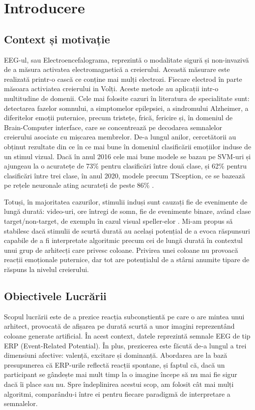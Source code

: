\chapter{Introducere}

\section{Context și motivație}
EEG-ul, sau Electroencefalograma, reprezintă o modalitate sigură și non-invazivă de a măsura activatea electromagnetică a creierului. Această măsurare este realizată printr-o cască ce conține mai mulți electrozi. Fiecare electrod în parte măsoara activiatea creierului in Volți. Aceste metode au aplicații intr-o multitudine de domenii. Cele mai folosite cazuri în literatura de specialitate sunt: detectarea fazelor somnului, a simptomelor epilepsiei, a sindromului Alzheimer, a diferitelor emoții puternice, precum tristețe, frică, fericire și, în domeniul de Brain-Computer interface, care se concentrează pe decodarea semnalelor creierului asociate cu mișcarea membrelor.
De-a lungul anilor, cercetătorii au obținut rezultate din ce în ce mai bune în domeniul clasificării emoțiilor induse de un stimul vizual. Dacă în anul 2016 cele mai bune modele se bazau pe SVM-uri și ajungeau la o acuratețe de 73\% \cite{ATKINSON201635} pentru clasificări între două clase, și 62\% pentru clasificări între trei clase, în anul 2020, modele precum TSception, ce se bazează pe rețele neuronale ating acurateți de peste 86\% \cite{TSception}. 

Totuși, în majoritatea cazurilor, stimulii induși sunt cauzați fie de evenimente de lungă durată: video-uri, ore întregi de somn, fie de evenimente binare, având clase target/non-target, de exemplu în cazul visual speller-elor \cite{visual_speller}. Mi-am propus să stabilesc dacă stimulii de scurtă durată au același potențial de a evoca răspunsuri capabile de a fi interpretate algoritmic precum cei de lungă durată în contextul unui grup de arhitecți care privesc coloane. Privirea unei coloane nu provoacă reacții emoționale puternice, dar tot are potențialul de a stârni anumite tipare de răspuns la nivelul creierului.

\section{Obiectivele Lucrării}
Scopul lucrării este de a prezice reacția subconștientă pe care o are mintea unui arhitect, provocată de afișarea pe durată scurtă a unor imagini reprezentând coloane generate artificial. În acest context, datele reprezintă semnale EEG de tip ERP (Event-Related Potential). În plus, prezicerea este făcută de-a lungul a trei dimensiuni afective: valență, excitare și dominanță. Abordarea are la bază presupunerea că ERP-urile reflectă reacții spontane, și faptul că, dacă un participant se gândește mai mult timp la o imagine începe să nu mai fie sigur dacă îi place sau nu. Spre îndeplinirea acestui scop, am folosit cât mai mulți algoritmi, comparându-i între ei pentru fiecare paradigmă de interpretare a semnalelor.

